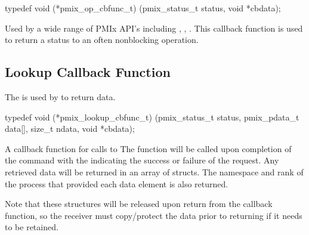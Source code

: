 \cspecificstart
\begin{codepar}
typedef void (*pmix_op_cbfunc_t)
    (pmix_status_t status, void *cbdata);
\end{codepar}
\cspecificend

\begin{arglist}
\end{arglist}

\descr

Used by a wide range of \ac{PMIx} API's including , , .
This callback function is used to return a status to an often nonblocking operation.


\subsection{Lookup Callback Function}

\summary

The  is used by  to return data.

\cspecificstart
\begin{codepar}
typedef void (*pmix_lookup_cbfunc_t)
    (pmix_status_t status,
     pmix_pdata_t data[], size_t ndata,
     void *cbdata);
\end{codepar}
\cspecificend

\begin{arglist}
\end{arglist}


\descr

A callback function for calls to 
The function will be called upon completion of the command with the  indicating the success or failure of the request.
Any retrieved data will be returned in an array of  structs.
The namespace and rank of the process that provided each data element is also returned.

Note that these structures will be released upon return from the callback function, so the receiver must copy/protect the data prior to returning if it needs to be retained.



